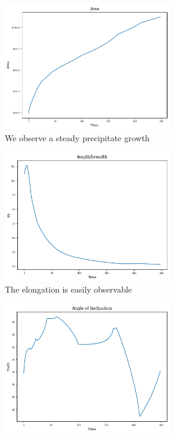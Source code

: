 \documentclass[12pt, a4paper]{report}
\begin{document}
\begin{figure}[H]
\centering
\begin{subfigure}{.4\textwidth}
  \centering
  \includegraphics[width=0.8\textwidth]{Pictures/Results/3area.jpeg}
  \caption{We observe a steady precipitate growth}
  \label{img:microstrImg}
\end{subfigure}
\begin{subfigure}{.4\textwidth}
  \centering
  \includegraphics[width=0.8\textwidth]{Pictures/Results/3lb.jpeg}
  \caption{The elongation is easily observable}
  \label{img:microstrImg}
\end{subfigure}
\begin{subfigure}{.4\textwidth}
  \centering
  \includegraphics[width=0.8\textwidth]{Pictures/Results/3theta.jpeg}

\end{subfigure}
\end{figure}
\end{document}
